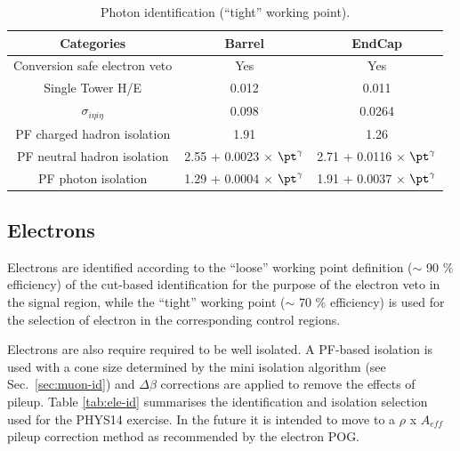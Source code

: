 \begin{table}[ht!]
  \caption{Photon identification (``tight'' working point).\label{tab:photon-id-gamma}}
  \centering
  \footnotesize
  \begin{tabular}{ ccc }
    \hline
    \hline
    Categories                    & Barrel                             & EndCap                             \\
    \hline
    Conversion safe electron veto & Yes                                & Yes                                \\
    Single Tower H/E              & 0.012                              & 0.011                               \\
    $\sigma_{i\eta i\eta}$        & 0.098                              & 0.0264                               \\
    PF charged hadron isolation   & 1.91                               & 1.26                               \\
    PF neutral hadron isolation   & 2.55 + 0.0023 $\times$ $\pt^{\gamma}$  & 2.71 + 0.0116 $\times$ $\pt^{\gamma}$  \\
    PF photon isolation           & 1.29 + 0.0004 $\times$ $\pt^{\gamma}$ & 1.91 + 0.0037 $\times$ $\pt^{\gamma}$ \\
    \hline
    \hline
  \end{tabular}
  \end{table}


\subsection{Electrons}
\label{sec:electron-id}
Electrons are identified according to the ``loose'' working point definition ($\sim$ 90 $\%$ efficiency) 
of the cut-based identification \cite{electron-id} for the purpose of the electron veto in the signal region, while the ``tight'' working point ($\sim$ 70 $\%$ efficiency) is used for the selection of electron in the corresponding control regions. 

Electrons are also require required to be well isolated. 
A PF-based isolation \cite{pf-photon} is used with a cone size determined by the mini isolation algorithm (see Sec.~\ref{sec:muon-id}) and $\Delta \beta$ corrections are applied to remove the effects of pileup. 
Table \ref{tab:ele-id} summarises the identification and isolation selection used for the PHYS14 exercise. In the future it is intended to move to a $\rho$ x $A_{eff}$ pileup correction method as recommended by the electron POG.

